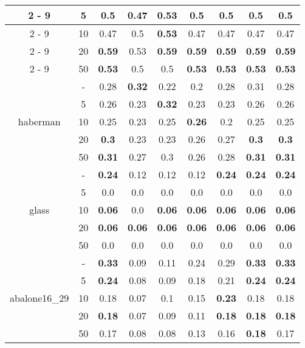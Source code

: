 \begin{table}[H]
\begin{center}
{\begin{tabular}{c|c|ccccccc}
				\cline{2%
					-%
					9}%
				&5&0.5&0.47&\textbf{0.53}&0.5&0.5&0.5&0.5\\%
				\cline{2%
					-%
					9}%
				&10&0.47&0.5&\textbf{0.53}&0.47&0.47&0.47&0.47\\%
				\cline{2%
					-%
					9}%
				&20&\textbf{0.59}&0.53&\textbf{0.59}&\textbf{0.59}&\textbf{0.59}&\textbf{0.59}&\textbf{0.59}\\%
				\cline{2%
					-%
					9}%
				&50&\textbf{0.53}&0.5&0.5&\textbf{0.53}&\textbf{0.53}&\textbf{0.53}&\textbf{0.53}\\%
				\hline%
				\multirow{5}{*}{haberman}&{-}&0.28&\textbf{0.32}&0.22&0.2&0.28&0.31&0.28\\%
				\cline{2%
					-%
					9}%
				&5&0.26&0.23&\textbf{0.32}&0.23&0.23&0.26&0.26\\%
				\cline{2%
					-%
					9}%
				&10&0.25&0.23&0.25&\textbf{0.26}&0.2&0.25&0.25\\%
				\cline{2%
					-%
					9}%
				&20&\textbf{0.3}&0.23&0.23&0.26&0.27&\textbf{0.3}&\textbf{0.3}\\%
				\cline{2%
					-%
					9}%
				&50&\textbf{0.31}&0.27&0.3&0.26&0.28&\textbf{0.31}&\textbf{0.31}\\%
				\hline%
				\multirow{5}{*}{glass}&{-}&\textbf{0.24}&0.12&0.12&0.12&\textbf{0.24}&\textbf{0.24}&\textbf{0.24}\\%
				\cline{2%
					-%
					9}%
				&5&0.0&0.0&0.0&0.0&0.0&0.0&0.0\\%
				\cline{2%
					-%
					9}%
				&10&\textbf{0.06}&0.0&\textbf{0.06}&\textbf{0.06}&\textbf{0.06}&\textbf{0.06}&\textbf{0.06}\\%
				\cline{2%
					-%
					9}%
				&20&\textbf{0.06}&\textbf{0.06}&\textbf{0.06}&\textbf{0.06}&\textbf{0.06}&\textbf{0.06}&\textbf{0.06}\\%
				\cline{2%
					-%
					9}%
				&50&0.0&0.0&0.0&0.0&0.0&0.0&0.0\\%
				\hline%
				\multirow{5}{*}{abalone16\_29}&{-}&\textbf{0.33}&0.09&0.11&0.24&0.29&\textbf{0.33}&\textbf{0.33}\\%
				\cline{2%
					-%
					9}%
				&5&\textbf{0.24}&0.08&0.09&0.18&0.21&\textbf{0.24}&\textbf{0.24}\\%
				\cline{2%
					-%
					9}%
				&10&0.18&0.07&0.1&0.15&\textbf{0.23}&0.18&0.18\\%
				\cline{2%
					-%
					9}%
				&20&\textbf{0.18}&0.07&0.09&0.11&\textbf{0.18}&\textbf{0.18}&\textbf{0.18}\\%
				\cline{2%
					-%
					9}%
				&50&0.17&0.08&0.08&0.13&0.16&\textbf{0.18}&0.17\\%

\end{tabular}}
\end{center}
\end{table}
